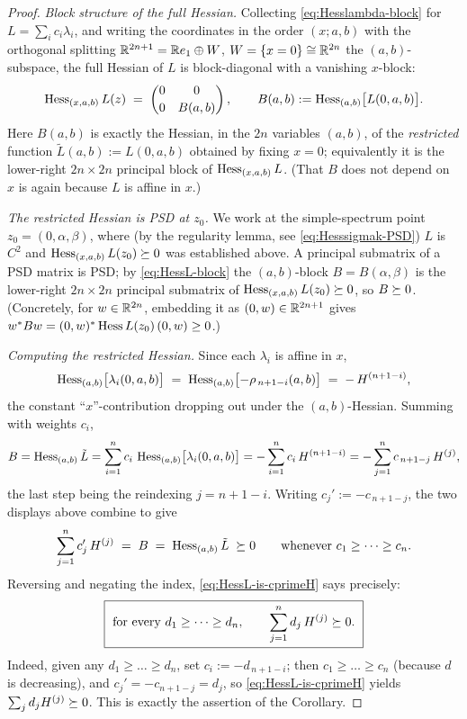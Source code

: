 \begin{proof}
\smallskip\noindent\emph{Block structure of the full Hessian.} Collecting
\eqref{eq:Hesslambda-block} for $L=\sum_i c_i\lambda_i$, and writing the
coordinates in the order $(x;a,b)$ with the orthogonal splitting
$\mathbb{R}^{2n+1}=\mathbb{R} e_1\oplus W$, $W=\{x=0\}\cong\mathbb{R}^{2n}$ the
$(a,b)$-subspace, the full Hessian of $L$ is block-diagonal with a vanishing
$x$-block:
\begin{equation}\label{eq:HessL-block}
\operatorname{Hess}_{(x,a,b)}L(z)
\;=\;
\begin{pmatrix} 0 & 0\\[2pt] 0 & B(a,b)\end{pmatrix},
\qquad
B(a,b):=\operatorname{Hess}_{(a,b)}\bigl[L(0,a,b)\bigr].
\end{equation}
Here $B(a,b)$ is exactly the Hessian, in the $2n$ variables $(a,b)$, of the
\emph{restricted} function $\tilde L(a,b):=L(0,a,b)$ obtained by fixing $x=0$;
equivalently it is the lower-right $2n\times2n$ principal block of
$\operatorname{Hess}_{(x,a,b)}L$. (That $B$ does not depend on $x$ is again because $L$ is
affine in $x$.)

\smallskip\noindent\emph{The restricted Hessian is PSD at $z_0$.} We work at the simple-spectrum
point $z_0=(0,\alpha,\beta)$, where (by the regularity lemma, see
\eqref{eq:Hesssigmak-PSD}) $L$ is $C^2$ and $\operatorname{Hess}_{(x,a,b)}L(z_0)\succeq 0$
was established above. A principal submatrix of a PSD matrix is PSD; by
\eqref{eq:HessL-block} the $(a,b)$-block $B=B(\alpha,\beta)$ is the lower-right
$2n\times2n$ principal submatrix of $\operatorname{Hess}_{(x,a,b)}L(z_0)\succeq 0$, so
$B\succeq 0$. (Concretely, for $w\in\mathbb{R}^{2n}$, embedding it as
$(0,w)\in\mathbb{R}^{2n+1}$ gives $w^\ast B w=(0,w)^\ast\operatorname{Hess} L(z_0)\,(0,w)\ge0$.)

\smallskip\noindent\emph{Computing the restricted Hessian.} Since each
$\lambda_i$ is affine in $x$,
\[
\operatorname{Hess}_{(a,b)}\bigl[\lambda_i(0,a,b)\bigr]
\;=\;\operatorname{Hess}_{(a,b)}\bigl[-\rho_{\,n+1-i}(a,b)\bigr]
\;=\;-\,H^{(n+1-i)},
\]
the constant ``$x$''-contribution dropping out under the $(a,b)$-Hessian. Summing
with weights $c_i$,
\[
B
=\operatorname{Hess}_{(a,b)}\tilde L
=\sum_{i=1}^n c_i\,\operatorname{Hess}_{(a,b)}\bigl[\lambda_i(0,a,b)\bigr]
=-\sum_{i=1}^n c_i\,H^{(n+1-i)}
=-\sum_{j=1}^n c_{\,n+1-j}\,H^{(j)},
\]
the last step being the reindexing $j=n+1-i$. Writing $c_j':=-c_{\,n+1-j}$,
the two displays above combine to give
\begin{equation}\label{eq:HessL-is-cprimeH}
\sum_{j=1}^n c_j'\,H^{(j)}\;=\;B\;=\;\operatorname{Hess}_{(a,b)}\tilde L\;\succeq 0
\qquad\text{whenever }c_1\ge\dots\ge c_n .
\end{equation}
Reversing and negating the index, \eqref{eq:HessL-is-cprimeH} says precisely:
\[
\boxed{\ \text{for every }d_1\ge\dots\ge d_n,\qquad \sum_{j=1}^n d_j\,H^{(j)}\qfourPSD.\ }
\]
Indeed, given any $d_1\ge\dots\ge d_n$, set $c_i:=-d_{\,n+1-i}$; then
$c_1\ge\dots\ge c_n$ (because $d$ is decreasing), and $c_j'=-c_{n+1-j}=d_j$, so
\eqref{eq:HessL-is-cprimeH} yields $\sum_j d_j H^{(j)}\succeq 0$. This is exactly the assertion of the Corollary.


\end{proof}
